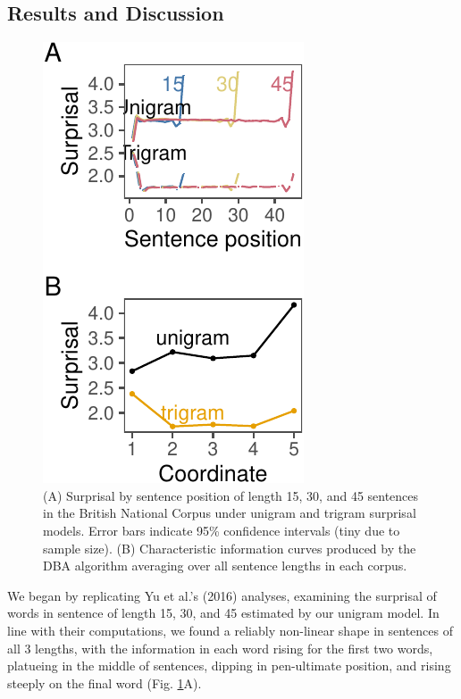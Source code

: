\documentclass[10pt, letterpaper]{article}
\newenvironment{CodeChunk}{}{}
\begin{document}
\hypertarget{results-and-discussion}{%
\subsection{Results and Discussion}\label{results-and-discussion}}

\begin{CodeChunk}
\begin{figure}[tb]

{\centering \includegraphics{figs/bnc_plots-1} 

}

\caption[(A) Surprisal by sentence position of length 15, 30, and 45 sentences in the British National Corpus under unigram and trigram surprisal models]{(A) Surprisal by sentence position of length 15, 30, and 45 sentences in the British National Corpus under unigram and trigram surprisal models. Error bars indicate 95\% confidence intervals (tiny due to sample size). (B) Characteristic information curves produced by the DBA algorithm averaging over all sentence lengths in each corpus. }\label{fig:bnc_plots}
\end{figure}
\end{CodeChunk}

We began by replicating Yu et al.'s (2016) analyses, examining the
surprisal of words in sentence of length 15, 30, and 45 estimated by our
unigram model. In line with their computations, we found a reliably
non-linear shape in sentences of all 3 lengths, with the information in
each word rising for the first two words, platueing in the middle of
sentences, dipping in pen-ultimate position, and rising steeply on the
final word (Fig. \ref{fig:bnc_plots}A).
\end{document}
